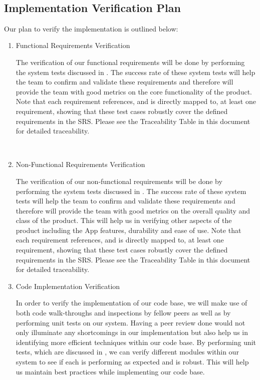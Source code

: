 \documentclass[12pt, titlepage]{article}
\begin{document}
\-\

\subsection{Implementation Verification Plan}

Our plan to verify the implementation is outlined below:
\begin{enumerate}
\item Functional Requirements Verification

\subitem The verification of our functional requirements will be done by performing the system tests discussed in . The success rate of these system tests will help the team to confirm and validate these requirements and therefore will provide the team with good metrics on the core functionality of the product. Note that each requirement references, and is directly mapped to, at least one requirement, showing that these test cases robustly cover the defined requirements in the SRS. Please see the Traceability Table in this document for detailed traceability.

~\newpage

\item Non-Functional Requirements Verification

\subitem The verification of our non-functional requirements will be done by performing the system tests discussed in . The success rate of these system tests will help the team to confirm and validate these requirements and therefore will provide the team with good metrics on the overall quality and class of the product. This will help us in verifying other aspects of the product including the App features, durability and ease of use. Note that each requirement references, and is directly mapped to, at least one requirement, showing that these test cases robustly cover the defined requirements in the SRS. Please see the Traceability Table in this document for detailed traceability.

\item Code Implementation Verification

\subitem In order to verify the implementation of our code base, we will make use of both code walk-throughs and inspections by fellow peers as well as by performing unit tests on our system. Having a peer review done would not only illuminate any shortcomings in our implementation but also help us in identifying more efficient techniques within our code base. By performing unit tests, which are discussed in , we can verify different modules within our system to see if each is performing as expected and is robust. This will help us maintain best practices while implementing our code base.

\end{enumerate}
\end{document}
